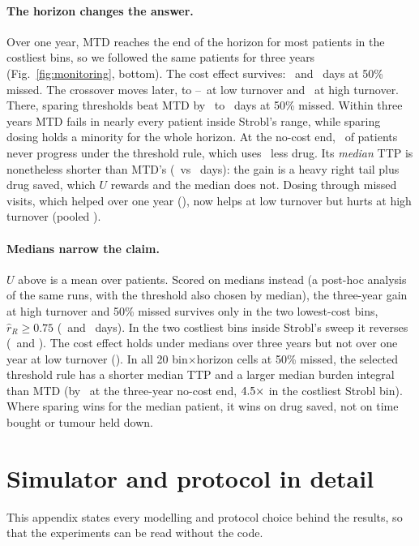 \documentclass[10pt]{article}
\begin{document}
\paragraph{The horizon changes the answer.} Over one year, MTD reaches the end of
the horizon for most patients in the costliest bins, so we followed the same
patients for three years (Fig.~\ref{fig:monitoring}, bottom). The cost effect
survives: \MOneBCostLow\ and \MOneBCostHigh\ days at 50\% missed. The crossover
moves later, to \MOneBPStarLowMin--\MOneBPStarLowMax\ at low turnover and
\MOneBPStarHigh\ at high turnover. There, sparing thresholds beat MTD by
\MOneBHighMin\ to \MOneBHighMax\ days at 50\% missed. Within three years MTD
fails in nearly every patient inside Strobl's range, while sparing dosing holds
a minority for the whole horizon. At the no-cost end, \MOneBTailCens\ of
patients never progress under the threshold rule, which uses \MOneBExpCut\ less
drug. Its \emph{median} TTP is nonetheless shorter than MTD's (\MOneBMedThr\ vs
\MOneBMedMtd\ days): the gain is a heavy right tail plus drug saved, which $U$
rewards and the median does not. Dosing through missed visits, which helped
over one year (\MOneMiss), now helps at low turnover but hurts at high turnover
(pooled \MOneBMiss). %

\paragraph{Medians narrow the claim.} $U$ above is a mean over patients. Scored
on medians instead (a post-hoc analysis of the same runs, with the threshold
also chosen by median), the three-year gain at high turnover and 50\% missed
survives only in the two lowest-cost bins, $\hat r_R \ge 0.75$ (\MOneCHighThree\
and \MOneCHighFour\ days). In the two costliest bins inside Strobl's sweep it
reverses (\MOneCHighOne\ and \MOneCHighTwo). The cost effect holds under medians
over three years but not over one year at low turnover (\MOneCCostOneLow). In
all 20 bin$\times$horizon cells at 50\% missed, the selected threshold rule has
a shorter median TTP and a larger median burden integral than MTD (by
\MOneCBurdenNoCost\ at the three-year no-cost end, $4.5\times$ in
the costliest Strobl bin). Where sparing wins for the median patient, it wins
on drug saved, not on time bought or tumour held down. %


\section{Simulator and protocol in detail}\label{sec:methods}
This appendix states every modelling and protocol choice behind the results, so
that the experiments can be read without the code.
\end{document}
